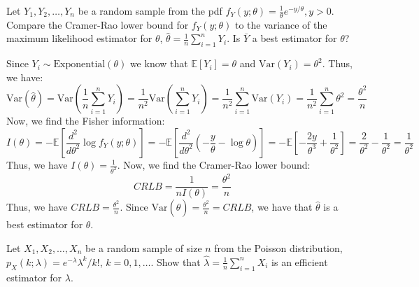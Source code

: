 \documentclass{article}
\newcommand{\E}{\mathbb{E}}
\newcommand{\V}{\text{Var}}
\begin{document}
\begin{probset}
\newpage

\begin{prob}[\textbf{5.5.1}]
    Let $Y_1, Y_2, \ldots, Y_n$ be a random sample from the pdf $f_Y(y; \theta) = \frac{1}{\theta} e^{-y/\theta}, y > 0$. Compare the Cramer-Rao lower bound for $f_Y(y; \theta)$ to the variance of the maximum likelihood estimator for $\theta$, $\hat{\theta} = \frac{1}{n} \sum_{i=1}^n Y_i$. Is $\bar Y$ a best estimator for $\theta$?

    \begin{soln}
        Since $Y_i \sim \text{Exponential}(\theta)$ we know that $\E[Y_i] = \theta$ and $\V(Y_i) = \theta^2$. Thus, we have:
        \[
            \V(\hat\theta) = \V\left(\frac{1}{n} \sum_{i=1}^n Y_i\right) = \frac{1}{n^2} \V\left(\sum_{i=1}^n Y_i\right) = \frac{1}{n^2} \sum_{i=1}^n \V(Y_i) = \frac{1}{n^2} \sum_{i=1}^n \theta^2 = \frac{\theta^2}{n}
        \]
        Now, we find the Fisher information:
        \[
            I(\theta) = -\E\left[\frac{d^2}{d\theta^2} \log f_Y(y; \theta)\right] = -\E\left[\frac{d^2}{d\theta^2} \left( -\frac{y}{\theta} - \log \theta \right)\right] = -\E\left[-\frac{2y}{\theta^3} + \frac{1}{\theta^2}\right] = \frac{2}{\theta^2} - \frac{1}{\theta^2} = \frac{1}{\theta^2}
        \]
        Thus, we have $I(\theta) = \frac{1}{\theta^2}$. Now, we find the Cramer-Rao lower bound:
        \[
            CRLB = \frac{1}{nI(\theta)} = \frac{\theta^2}{n}
        \]
        Thus, we have $CRLB = \frac{\theta^2}{n}$. Since $\V(\hat\theta) = \frac{\theta^2}{n} = CRLB$, we have that $\hat\theta$ is a best estimator for $\theta$.
    \end{soln}
\end{prob}

\begin{prob}[\textbf{5.5.2}]
    Let $X_1, X_2, \ldots, X_n$ be a random sample of size $n$ from the Poisson distribution, $p_X(k; \lambda) = e^{-\lambda} \lambda^k / k!$, $k = 0, 1, \ldots$. Show that $\hat{\lambda} = \frac{1}{n} \sum_{i=1}^n X_i$ is an efficient estimator for $\lambda$.


\end{prob}
\end{probset}
\end{document}
